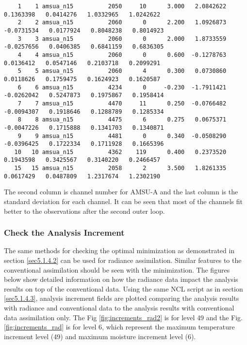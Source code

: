 \begin{scriptsize}
\begin{verbatim}
    1    1 amsua_n15          2050     10      3.000   2.0842622   0.1363398   0.0414276   1.0332965   1.0242622
    2    2 amsua_n15          2060      0      2.200   1.0926873  -0.0731534   0.0177924   0.8048238   0.8014923
    3    3 amsua_n15          2060      0      2.000   1.8733559  -0.0257656   0.0406385   0.6841159   0.6836305
    4    4 amsua_n15          2060      0      0.600  -0.1278763   0.0136412   0.0547146   0.2103718   0.2099291
    5    5 amsua_n15          2060      4      0.300   0.0730860   0.0118626   0.1759475   0.1624923   0.1620587
    6    6 amsua_n15          4234      0     -0.230  -1.7911421  -0.0262042   0.5247873   0.1975867   0.1958414
    7    7 amsua_n15          4470     11      0.250  -0.0766482  -0.0094307   0.1918646   0.1288789   0.1285334
    8    8 amsua_n15          4475      6      0.275   0.0675371  -0.0047226   0.1715888   0.1341703   0.1340871
    9    9 amsua_n15          4481      0      0.340  -0.0508290  -0.0396425   0.1722334   0.1711928   0.1665396
   10   10 amsua_n15          4362    119      0.400   0.2373520   0.1943598   0.3425567   0.3140220   0.2466457
   15   15 amsua_n15          2058      2      3.500   1.8261335   0.0617429   0.0487809   1.2317674   1.2302190
\end{verbatim}
\end{scriptsize}

The second column is channel number for AMSU-A and the last column is the standard deviation for each channel.  It can be seen that most of the channels fit better to the observations after the second outer loop. 

\subsubsection{Check the Analysis Increment}

The same methods for checking the optimal minimization as demonstrated in section \ref{sec5.1.4.2} can be used for radiance assimilation.  Similar features to the conventional assimilation should be seen with the minimization. The figures below show detailed information on how the radiance data impact the analysis results on top of the conventional data.  Using the same NCL script as in section \ref{sec5.1.4.3}, analysis increment fields are plotted comparing the analysis results with radiance and conventional data to the analysis results with conventional data assimilation only.  The Fig \ref{fig:increments_rad2} is for level 49 and the Fig.\ref{fig:increments_rad} is for level 6, which represent the maximum temperature increment level (49) and maximum moisture increment level (6).  

